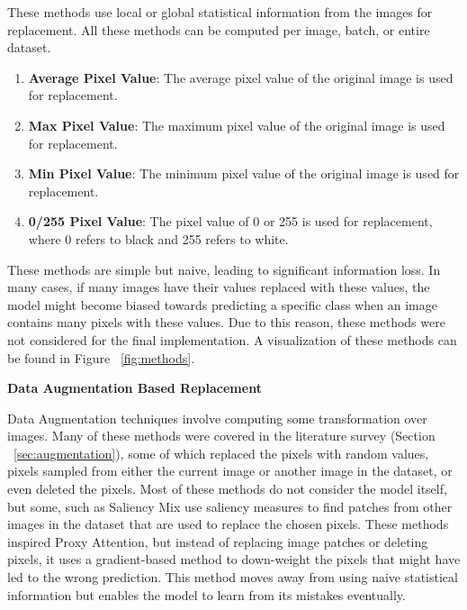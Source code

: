 These methods use local or global statistical information from the images for replacement. All these methods can be computed per image, batch, or entire dataset.

\begin{enumerate}
    \item \textbf{Average Pixel Value}: The average pixel value of the original image is used for replacement.
    \item \textbf{Max Pixel Value}: The maximum pixel value of the original image is used for replacement.
    \item \textbf{Min Pixel Value}: The minimum pixel value of the original image is used for replacement.
    \item \textbf{0/255 Pixel Value}: The pixel value of 0 or 255 is used for replacement, where 0 refers to black and 255 refers to white.
\end{enumerate}
These methods are simple but naive, leading to significant information loss. In many cases, if many images have their values replaced with these values, the model might become biased towards predicting a specific class when an image contains many pixels with these values.
Due to this reason, these methods were not considered for the final implementation. A visualization of these methods can be found in Figure ~\ref{fig:methods}.

\textbf{Data Augmentation Based Replacement}

Data Augmentation techniques involve computing some transformation over images. Many of these methods were covered in the literature survey (Section ~\ref{sec:augmentation}), some of which replaced the pixels with random values, pixels sampled from either the current image or another image in the dataset, or even deleted the pixels. Most of these methods do not consider the model itself, but some, such as Saliency Mix \cite{uddinSaliencyMixSaliencyGuided2021} use saliency measures to find patches from other images in the dataset that are used to replace the chosen pixels.
These methods inspired Proxy Attention, but instead of replacing image patches or deleting pixels, it uses a gradient-based method to down-weight the pixels that might have led to the wrong prediction. This method moves away from using naive statistical information but enables the model to learn from its mistakes eventually.



